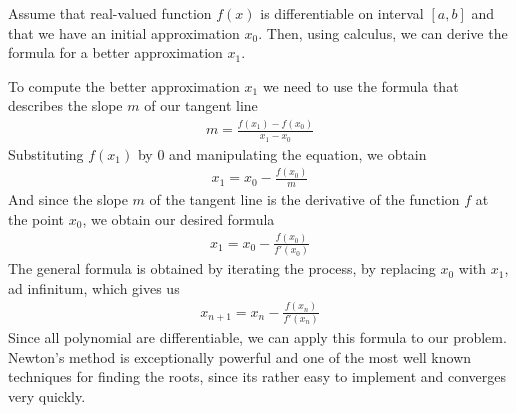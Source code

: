 \documentclass[
  digital, %
  table,   %
  nolof,     %
  nolot,     %
	draft, %
]{fithesis3}
\begin{document}
Assume that real-valued function $f(x)$ is differentiable on interval $[a,b]$ and that we have an initial approximation $x_{0}$. Then, using calculus, we can derive the formula for a better approximation $x_{1}$.


To compute the better approximation $x_{1}$ we need to use the formula that describes the slope $m$ of our tangent line
\begin{align}
      m = \frac{f(x_{1}) - f(x_{0})}{x_{1} - x_{0}}
\end{align}
Substituting $f(x_{1})$ by $0$ and manipulating the equation, we obtain
\begin{align}
      x_{1} = x_{0} - \frac{f(x_{0})}{m}
\end{align}
And since the slope $m$ of the tangent line is the derivative of the function $f$ at the point $x_{0}$, we obtain our desired formula 
\begin{align}
      x_{1} = x_{0} - \frac{f(x_{0})}{f'(x_{0})}
\end{align}
The general formula is obtained by iterating the process, by replacing $x_{0}$ with $x_{1}$, ad infinitum, which gives us 
\begin{align}
      x_{n+1} = x_{n} - \frac{f(x_{n})}{f'(x_{n})} \label{eq:newt}
\end{align}
Since all polynomial are differentiable, we can apply this formula to our problem. Newton's method is exceptionally powerful and one of the most well known techniques for finding the roots, since its rather easy to implement and converges very quickly. 
\end{document}
